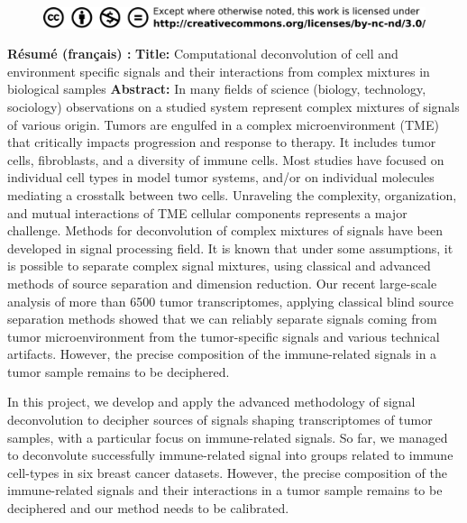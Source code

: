 \documentclass[12pt,]{book}
\theoremstyle{definition}
\theoremstyle{definition}
\theoremstyle{definition}
\theoremstyle{remark}
\begin{document}
\begin{titlepage}
\begin{figure}[b]
\begin{center}
\includegraphics{figures-ext/creativecommons}
\end{center}
\end{figure}




\clearpage


\newpage
\thispagestyle{empty}
\noindent %
\textbf{Résumé (français) :}
\vskip 1cm
\noindent
\textbf{Title: }
Computational deconvolution of cell and environment specific signals and their interactions from complex mixtures in biological samples
\vskip 1cm
\noindent
\textbf{Abstract:}
In many fields of science (biology, technology, sociology) observations on a studied system represent complex mixtures of signals of various origin. Tumors are engulfed in a complex microenvironment (TME) that critically impacts progression and response to therapy. It includes tumor cells, fibroblasts, and a diversity of immune cells. Most studies have focused on individual cell types in model tumor systems, and/or on individual molecules mediating a crosstalk between two cells. Unraveling the complexity, organization, and mutual interactions of TME cellular components represents a major challenge.
Methods for deconvolution of complex mixtures of signals have been developed in signal processing field. It is known that under some assumptions, it is possible to separate complex signal mixtures, using classical and advanced methods of source separation and dimension reduction. Our recent large-scale analysis of more than 6500 tumor transcriptomes, applying classical blind source separation methods showed that we can reliably separate signals coming from tumor microenvironment from the tumor-specific signals and various technical artifacts. However, the precise composition of the immune-related signals in a tumor sample remains to be deciphered.

In this project, we develop and apply the advanced methodology of signal deconvolution to decipher sources of signals shaping transcriptomes of tumor samples, with a particular focus on immune-related signals. So far, we managed to deconvolute successfully immune-related signal into groups related to immune cell-types in six breast cancer datasets. However, the precise composition of the immune-related signals and their interactions in a tumor sample remains to be deciphered and our method needs to be calibrated.


\end{titlepage}
\end{document}

